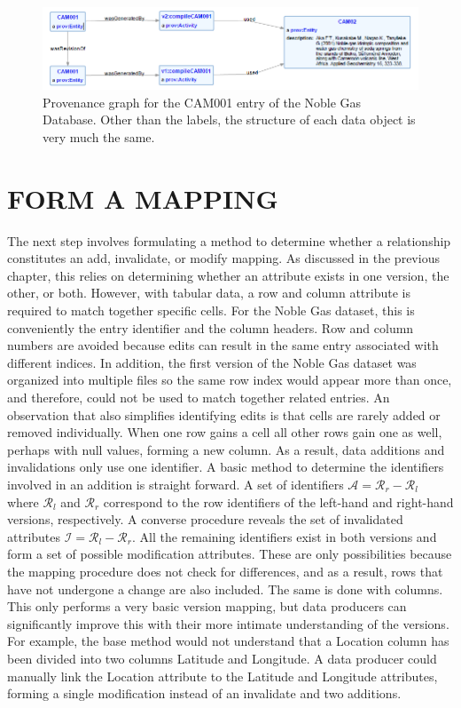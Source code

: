 \begin{figure}
	\centering
	\includegraphics[scale=0.70]{figures/CAM001v1v2.png}
	\caption{Provenance graph for the CAM001 entry of the Noble Gas Database.  Other than the labels, the structure of each data object is very much the same.}
	\label{CAM001ProvGraph}
\end{figure}

\section{FORM A MAPPING}

The next step involves formulating a method to determine whether a relationship constitutes an add, invalidate, or modify mapping.
As discussed in the previous chapter, this relies on determining whether an attribute exists in one version, the other, or both.
However, with tabular data, a row and column attribute is required to match together specific cells.
For the Noble Gas dataset, this is conveniently the entry identifier and the column headers.
Row and column numbers are avoided because edits can result in the same entry associated with different indices.
In addition, the first version of the Noble Gas dataset was organized into multiple files so the same row index would appear more than once, and therefore, could not be used to match together related entries.
An observation that also simplifies identifying edits is that cells are rarely added or removed individually.
When one row gains a cell all other rows gain one as well, perhaps with null values, forming a new column.
As a result, data additions and invalidations only use one identifier.
A basic method to determine the identifiers involved in an addition is straight forward.
A set of identifiers \(\mathcal{A} = \mathcal{R}_{r} - \mathcal{R}_{l}\) where \(\mathcal{R}_{l}\) and \(\mathcal{R}_{r}\) correspond to the row identifiers of the left-hand and right-hand versions, respectively.
A converse procedure reveals the set of invalidated attributes \(\mathcal{I} = \mathcal{R}_{l} - \mathcal{R}_{r}\).
All the remaining identifiers exist in both versions and form a set of possible modification attributes.
These are only possibilities because the mapping procedure does not check for differences, and as a result, rows that have not undergone a change are also included.
The same is done with columns.
This only performs a very basic version mapping, but data producers can significantly improve this with their more intimate understanding of the versions.
For example, the base method would not understand that a Location column has been divided into two columns Latitude and Longitude.
A data producer could manually link the Location attribute to the Latitude and Longitude attributes, forming a single modification instead of an invalidate and two additions.

